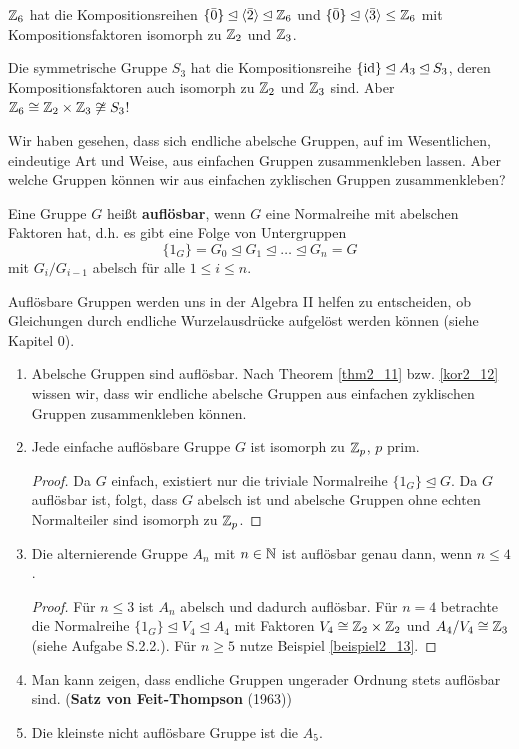 \begin{beispiel}
	$\mathbb{Z}_6$ hat die Kompositionsreihen $\{\bar{0}\} \unlhd \langle \bar{2} \rangle \unlhd \mathbb{Z}_6$ und $\{\bar{0}\} \unlhd \langle \bar{3} \rangle \leq \mathbb{Z}_6$ mit Kompositionsfaktoren isomorph zu $\mathbb{Z}_2$ und $\mathbb{Z}_3$.
	
	Die symmetrische Gruppe $S_3$ hat die Kompositionsreihe $\{\mathrm{id}\} \unlhd A_3 \unlhd S_3$, deren Kompositionsfaktoren auch isomorph zu $\mathbb{Z}_2$ und $\mathbb{Z}_3$ sind. Aber $\mathbb{Z}_6 \cong \mathbb{Z}_2 \times \mathbb{Z}_3 \not\cong S_3$!
\end{beispiel}
Wir haben gesehen, dass sich endliche abelsche Gruppen, auf im Wesentlichen, eindeutige Art und Weise, aus einfachen Gruppen zusammenkleben lassen. Aber welche Gruppen können wir aus einfachen zyklischen Gruppen zusammenkleben?
\begin{definition}
	Eine Gruppe $G$ heißt \textbf{auflösbar}, wenn $G$ eine Normalreihe mit abelschen Faktoren hat, d.h. es gibt eine Folge von Untergruppen
	\[\{1_G\} = G_0 \unlhd G_1 \unlhd \dots \unlhd G_n = G\]
	mit $G_i/G_{i-1}$ abelsch für alle $1 \leq i \leq n$.
\end{definition}
\begin{rem}
	Auflösbare Gruppen werden uns in der Algebra II helfen zu entscheiden, ob Gleichungen durch endliche Wurzelausdrücke aufgelöst werden können (siehe Kapitel 0).
\end{rem}
\begin{beispiel}\label{beispiel2_20}
	\begin{enumerate}[label=(\arabic*)]
		\item Abelsche Gruppen sind auflösbar. Nach Theorem \ref{thm2_11} bzw. \ref{kor2_12} wissen wir, dass wir endliche abelsche Gruppen aus einfachen zyklischen Gruppen zusammenkleben können.
		\item Jede einfache auflösbare Gruppe $G$ ist isomorph zu $\mathbb{Z}_p$, $p$ prim.
		\begin{proof}
			Da $G$ einfach, existiert nur die triviale Normalreihe $\{1_G\} \unlhd G$. Da $G$ auflösbar ist, folgt, dass $G$ abelsch ist und abelsche Gruppen ohne echten Normalteiler sind isomorph zu $\mathbb{Z}_p$.
		\end{proof}
		\item Die alternierende Gruppe $A_n$ mit $n \in \mathbb{N}$ ist auflösbar genau dann, wenn $n \leq 4$.
		\begin{proof}
			Für $n \leq 3$ ist $A_n$ abelsch und dadurch auflösbar. Für $n = 4$ betrachte die Normalreihe $\{1_G\} \unlhd V_4 \unlhd A_4$ mit Faktoren $V_4 \cong \mathbb{Z}_2 \times \mathbb{Z}_2$ und $A_4 / V_4 \cong \mathbb{Z}_3$ (siehe Aufgabe S.2.2.). Für $n \geq 5$ nutze Beispiel \ref{beispiel2_13}.
		\end{proof}
		\item Man kann zeigen, dass endliche Gruppen ungerader Ordnung stets auflösbar sind. (\textbf{Satz von Feit-Thompson} (1963))
		\item Die kleinste nicht auflösbare Gruppe ist die $A_5$.
	\end{enumerate}
\end{beispiel}
